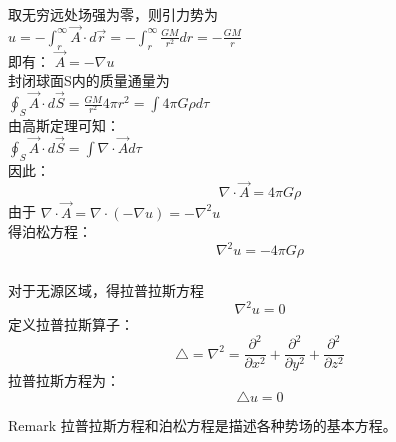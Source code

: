 \begin{frame}
	\frametitle{}
	取无穷远处场强为零，则引力势为\\
	$\displaystyle  u = -\int_{r}^{\infty} \overrightarrow{A}\cdot d \overrightarrow{r} =- \int_{r}^{\infty} \frac{GM}{r^2} dr =- \frac{GM}{r} $ \\
	即有： $\overrightarrow{A} =-\nabla u$ \\
	封闭球面S内的质量通量为 \\
	$\displaystyle \oint_{S} \overrightarrow{A} \cdot d \overrightarrow{S} = \frac{GM}{r^2} 4\pi r^2 =\int  4\pi G  \rho d\tau$  \\
	由高斯定理可知：\\
	$ \displaystyle \oint_{S} \overrightarrow{A} \cdot d \overrightarrow{S} =\int  \nabla \cdot \overrightarrow{A} d\tau $\\
	因此： 
	\begin{equation*}
		\nabla \cdot \overrightarrow{A} = 4\pi G \rho
	\end{equation*}
	由于 $\nabla \cdot \overrightarrow{A} = \nabla \cdot \left(-\nabla u\right)= -\nabla ^2 u$ \\
	得泊松方程：
	\begin{equation*}
		\nabla ^2 u= -4\pi G \rho
	\end{equation*}	
\end{frame}	

\begin{frame}
	\frametitle{}
	对于无源区域，得拉普拉斯方程
	\begin{equation*}
		\nabla ^2  u =0 
	\end{equation*}
	定义拉普拉斯算子：
	\begin{equation*}
		\triangle  = \nabla ^2 = \frac{\partial ^2}{\partial x^2} +\frac{\partial^2 }{\partial y^2} +\frac{\partial^2  }{\partial z^2}	
	\end{equation*}
	拉普拉斯方程为：
	\begin{equation*}
		\triangle   u =0 
	\end{equation*}
	\begin{block}{Remark}
		拉普拉斯方程和泊松方程是描述各种势场的基本方程。
	\end{block}
\end{frame}	


